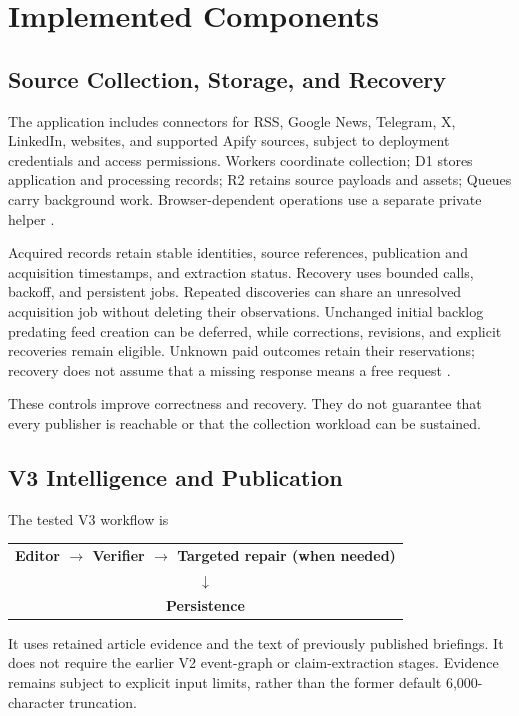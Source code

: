 \section{Implemented Components}

\subsection{Source Collection, Storage, and Recovery}

The application includes connectors for RSS, Google News, Telegram, X, LinkedIn, websites, and supported Apify sources, subject to deployment credentials and access permissions. Workers coordinate collection; D1 stores application and processing records; R2 retains source payloads and assets; Queues carry background work. Browser-dependent operations use a separate private helper \cite{repo,stagingintegration,acquisitionrecord}.

Acquired records retain stable identities, source references, publication and acquisition timestamps, and extraction status. Recovery uses bounded calls, backoff, and persistent jobs. Repeated discoveries can share an unresolved acquisition job without deleting their observations. Unchanged initial backlog predating feed creation can be deferred, while corrections, revisions, and explicit recoveries remain eligible. Unknown paid outcomes retain their reservations; recovery does not assume that a missing response means a free request \cite{canaryrecovery,freshpoll}.

These controls improve correctness and recovery. They do not guarantee that every publisher is reachable or that the collection workload can be sustained.

\subsection{V3 Intelligence and Publication}

The tested V3 workflow is
\begin{center}
\begin{tabular}{c}\textbf{Editor $\rightarrow$ Verifier $\rightarrow$ Targeted repair (when needed)}\\$\downarrow$\\\textbf{Persistence}\end{tabular}
\end{center}
It uses retained article evidence and the text of previously published briefings. It does not require the earlier V2 event-graph or claim-extraction stages. Evidence remains subject to explicit input limits, rather than the former default 6,000-character truncation.

